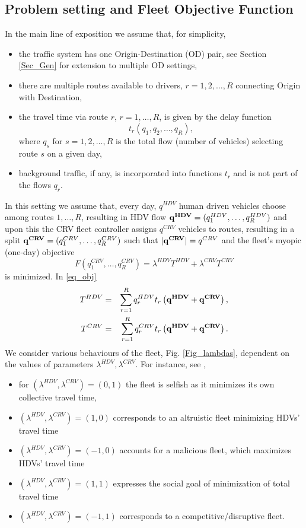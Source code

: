 \documentclass[a4paper,11pt]{article}
\begin{document}
\subsection{Problem setting and Fleet Objective Function}
\label{Sec_FOF}
In the main line of exposition we 
assume that, for simplicity,  
\begin{itemize}
\item the traffic system has one Origin-Destination (OD) pair, see Section \ref{Sec_Gen} for extension to multiple OD settings,
\item there are multiple routes available to drivers, $r = 1,2, \dots, R$ connecting Origin with Destination,
\item the travel time via route $r$, $r = 1,\dots, R$, is given by the delay function $$t_r(q_1, q_2, \dots, q_R),$$ where $q_s$ for $s = 1,2, \dots, R$ is the total flow (number of vehicles) selecting route $s$ on a given day,
\item background traffic, if any, is incorporated into functions $t_r$ and is not part of the flows $q_r$.
\end{itemize}
\noindent In this setting we assume that, every day, $q^{HDV}$ human driven vehicles choose among routes $1, \dots, R$, resulting in HDV flow $\bold{q^{HDV}} = (q_1^{HDV}, \dots, q_R^{HDV})$  and upon this the CRV fleet controller assigns $q^{CRV}$ vehicles to routes, resulting in a split $\bold{q^{CRV}} = (q^{CRV}_1, \dots, q^{CRV}_R)$ such that $|\bold{q^{CRV}}| = q^{CRV}$ and the fleet's myopic (one-day) objective 
\begin{equation}
F(q^{CRV}_1, \dots, q^{CRV}_R) = \lambda^{HDV} T^{HDV} + \lambda^{CRV} T^{CRV}
\label{eq_obj} 
\end{equation}
is minimized. In \eqref{eq_obj} 
\begin{eqnarray*}
T^{HDV} &=& \sum_{r = 1}^R q^{HDV}_r t_{r} \left(\bold{q^{HDV}} + \bold{q^{CRV}}\right),\\
T^{CRV} &=& \sum_{r=1 }^R q^{CRV}_r t_{r} \left(\bold{q^{HDV}} + \bold{q^{CRV}}\right).
\end{eqnarray*}
We consider various behaviours of the fleet, Fig. \ref{Fig_lambdas}, dependent on the values of parameters $\lambda^{HDV}, \lambda^{CRV}$. For instance, see \cite{JamrozSciRep}, 
\begin{itemize}
\item for $(\lambda^{HDV}, \lambda^{CRV}) = (0,1)$ the fleet is selfish as it minimizes its own collective travel time, 
\item $(\lambda^{HDV}, \lambda^{CRV}) = (1,0)$ corresponds to an altruistic fleet minimizing HDVs' travel time
\item $(\lambda^{HDV}, \lambda^{CRV}) = (-1,0)$ accounts for a malicious fleet, which maximizes HDVs' travel time 
\item $(\lambda^{HDV}, \lambda^{CRV}) = (1,1)$ expresses the social goal of minimization of total travel time 
\item  $(\lambda^{HDV}, \lambda^{CRV}) = (-1,1)$ corresponds to a competitive/disruptive fleet. 
\end{itemize}
\end{document}
